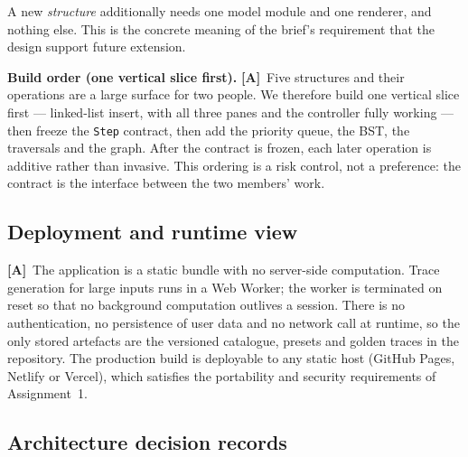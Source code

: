 \documentclass[11pt,a4paper]{article}
\newcommand{\A}{\textcolor{asmc}{\textbf{[A]}}}     %
\newcommand{\ct}[1]{\texttt{#1}}
\begin{document}
\noindent A new \emph{structure} additionally needs one model module and one renderer, and nothing
else. This is the concrete meaning of the brief's requirement that the design support future
extension.

\smallskip
\noindent\textbf{Build order (one vertical slice first).} \A\ Five structures and their operations are
a large surface for two people. We therefore build one vertical slice first --- linked-list insert,
with all three panes and the controller fully working --- then freeze the \ct{Step} contract, then
add the priority queue, the BST, the traversals and the graph. After the contract is frozen, each
later operation is additive rather than invasive. This ordering is a risk control, not a
preference: the contract is the interface between the two members' work.

\subsection{Deployment and runtime view}

\A\ The application is a static bundle with no server-side computation. Trace generation for large
inputs runs in a Web Worker; the worker is terminated on reset so that no background computation
outlives a session. There is no authentication, no persistence of user data and no network call at
runtime, so the only stored artefacts are the versioned catalogue, presets and golden traces in the
repository. The production build is deployable to any static host (GitHub Pages, Netlify or Vercel),
which satisfies the portability and security requirements of Assignment~1.

\subsection{Architecture decision records}
\end{document}
